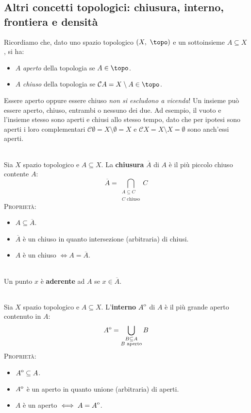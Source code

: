 \subsection{Altri concetti topologici: chiusura, interno, frontiera e densità}
Ricordiamo che, dato uno spazio topologico $\left(X,\ \topo\right)$ e un sottoinsieme $A\subseteq X$, si ha:
\begin{itemize}
\item $A$ \textit{aperto} della topologia se $A\in\topo$.
\item $A$ \textit{chiuso} della topologia se $\mathcal{C}A=X\setminus A\in\topo$.
\end{itemize}
\begin{attention}
Essere aperto oppure essere chiuso \textit{non si escludono a vicenda}! Un insieme può essere aperto, chiuso, entrambi o nessuno dei due. Ad esempio, il vuoto e l'insieme stesso sono aperti e chiusi allo stesso tempo, dato che per ipotesi sono aperti i loro complementari $\mathcal{C}\emptyset = X\setminus \emptyset = X$ e $\mathcal{C}X = X\setminus X = \emptyset$ sono anch'essi aperti.
\end{attention}
\begin{define}[Chiusura.]~{}\\
Sia $X$ spazio topologico e $A\subseteq X$. La \textbf{chiusura} $\overline{A}$ di $A$ è il più piccolo chiuso contente $A$:
\begin{equation}
\overline{A}=\bigcap_{\substack{A\subseteq C\\C\text{ chiuso}}}C
\end{equation}
\textsc{Proprietà:}
\begin{itemize}
\item $A\subseteq \overline{A}$.
\item $\overline{A}$ è un chiuso in quanto intersezione (arbitraria) di chiusi.
\item $A$ è un chiuso $\iff A=\overline{A}$.
\end{itemize}
\vspace{-3mm}
\end{define}
\begin{define}~{}\\
Un punto $x$ è \textbf{aderente} ad $A$ se $x\in\overline{A}$.
\end{define}
\begin{define}[Interno.]~{}\\
Sia $X$ spazio topologico e $A\subseteq X$. L'\textbf{interno} ${\kern0ptA}^{\mathrm{o}}$ di $A$ è il più grande aperto contenuto in $A$:
\begin{equation}
	{\kern0ptA}^{\mathrm{o}}=\bigcup_{\substack{B\subseteq A\\B\text{ aperto}}}B
\end{equation}
\textsc{Proprietà:}
\begin{itemize}
	\item ${\kern0ptA}^{\mathrm{o}}\subseteq A$.
	\item ${\kern0ptA}^{\mathrm{o}}$ è un aperto in quanto unione (arbitraria) di aperti.
	\item $A$ è un aperto $\iff A={\kern0ptA}^{\mathrm{o}}$.
\end{itemize}
\vspace{-3mm}
\end{define}
